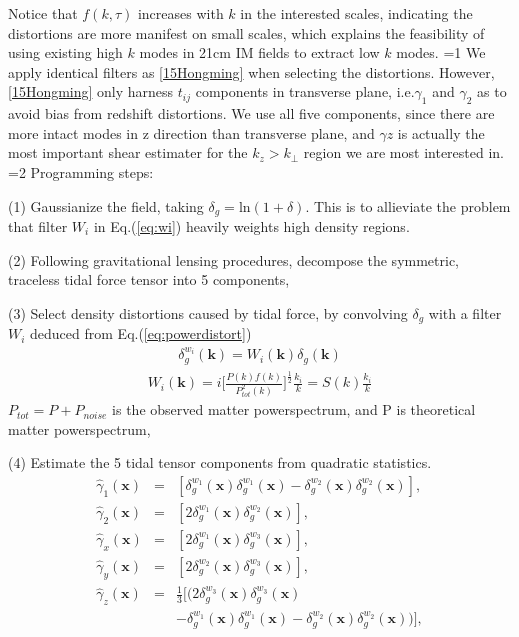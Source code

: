 Notice that $f(k,\tau)$ increases with $k$ in the interested scales, 
indicating the distortions are more manifest on small scales, 
which explains the feasibility of using existing high $k$ modes in 21cm 
IM fields to extract low $k$ modes. 
=1
We apply identical filters as \ref{15Hongming} 
when selecting the distortions. 
However, \ref{15Hongming} only harness $t_{ij}$ components 
in transverse plane, i.e.$\gamma_1$ and $\gamma_2$ 
as to avoid bias from redshift distortions. 
We use all five components, since there are more intact modes in 
z direction than transverse plane, 
and $\gamma z$ is actually the most important 
shear estimater for the $k_z>k_\perp$ region 
we are most interested in.
\fi
{}=2
Programming steps:\noindent

(1) Gaussianize the field, taking 
$\delta_g=\mathrm{ln}(1+\delta)$. 
This is to allieviate the problem that filter $W_i$ in Eq.(\ref{eq:wi}) heavily weights high density regions.

(2) Following gravitational lensing procedures, decompose the symmetric, traceless tidal force tensor into 5 components, 

(3) Select density distortions caused by tidal force, 
by convolving $\delta_g$ with a filter $W_i$ 
deduced from Eq.(\ref{eq:powerdistort}) 
\begin{eqnarray}
\delta^{w_i}_g(\bm{k})=W_i(\bm{k})\delta_g(\bm{k}) 
\end{eqnarray}
\begin{eqnarray}
\label{eq:wi}
W_i(\bm{k})=i \bigg[\frac{P(k)f(k)}{P_{tot}^2(k)}\bigg]^{\frac{1}{2}}\frac{k_i}{k}
=S(k)\frac{k_i}{k}\nonumber
\end{eqnarray}
$P_{tot}=P+P_{noise}$ is the observed matter powerspectrum, 
and P is theoretical matter powerspectrum,

(4) Estimate the 5 tidal tensor components from quadratic statistics.
\begin{eqnarray}
\label{eq:gamma}
\hat{\gamma}_1(\bm{x})&=&
[{\delta}^{w_1}_g(\bm{x}){\delta}^{w_1}_g(\bm{x})-
{\delta}^{w_2}_g(\bm{x}){\delta}^{w_2}_g(\bm{x})],\nonumber\\
\hat{\gamma}_2(\bm{x})&=&
[2{\delta}^{w_1}_g(\bm{x}){\delta}^{w_2}_g(\bm{x})],\nonumber\\
\hat{\gamma}_x(\bm{x})&=&
[2{\delta}^{w_1}_g(\bm{x}){\delta}^{w_3}_g(\bm{x})],\\
\hat{\gamma}_y(\bm{x})&=&
[2{\delta}^{w_2}_g(\bm{x}){\delta}^{w_3}_g(\bm{x})],\nonumber\\
\hat{\gamma}_z(\bm{x})&=&
\frac{1}{3}[(2{\delta}^{w_3}_g(\bm{x}){\delta}^{w_3}_g(\bm{x})\nonumber\\
&&-{\delta}^{w_1}_g(\bm{x}){\delta}^{w_1}_g(\bm{x})
-{\delta}^{w_2}_g(\bm{x}){\delta}^{w_2}_g(\bm{x}))],\nonumber
\end{eqnarray}

